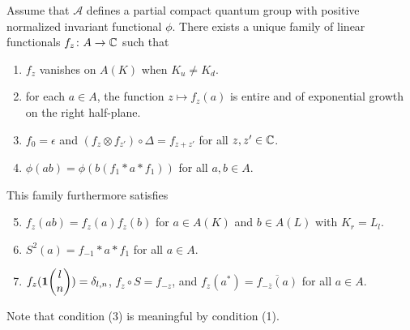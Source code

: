 \begin{Theorem} \label{thm:rep-characters}
  Assume that $\mathscr{A}$ defines a partial compact quantum group with positive normalized
  invariant functional $\phi$.  There exists a unique family of linear functionals
  $f_{z} \colon A\to \mathbb{C}$ such that
\begin{enumerate}[label={(\arabic*)}]
  \item $f_z$ vanishes on $A(K)$ when $K_u\neq K_d$.
  \item for each $a\in A$, the function $z\mapsto f_{z}(a)$ is entire
    and of exponential growth on the right half-plane.
  \item $f_{0} = \epsilon$ and $(f_{z} \otimes f_{z'}) \circ 
    \Delta= f_{z+z'}$ for all $z,z' \in \mathbb{C}$.
  \item $\phi(ab)=\phi(b(f_{1} \ast a \ast f_{1}))$ for all $a,b\in A$.
  \end{enumerate}
  This family furthermore satisfies
  \begin{enumerate}[label={(\arabic*)}]\setcounter{enumi}{4}
  \item $f_z(ab) = f_z(a)f_z(b)$ for $a\in A(K)$ and $b\in A(L)$ with $K_r = L_l$. 
  \item $S^{2}(a)=f_{-1} \ast a \ast f_{1}$ for all $a\in A$.
  \item $f_{z}(\mathbf{1}\!\begin{pmatrix} l \\ n\end{pmatrix})=\delta_{l,n}$,  $f_{z} \circ S = f_{-z}$,
and    $f_{z}(a^*) = \overline{f_{-\overline{z}}(a)}$ for all $a\in A$.
\end{enumerate}
\end{Theorem}


Note that condition (3) is meaningful by condition (1).


